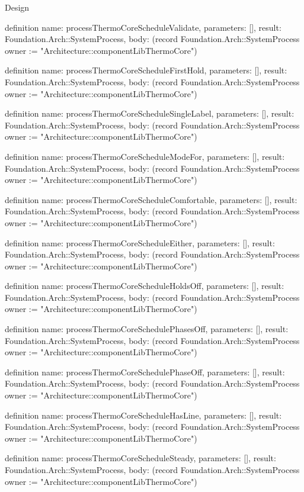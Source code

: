 \begin{lexlean}{Design}
\begin{semanticmodule}
definition{
  name: processThermoCoreScheduleValidate,
  parameters: [],
  result: Foundation.Arch::SystemProcess,
  body: (record Foundation.Arch::SystemProcess {owner := "Architecture::componentLibThermoCore"})
}

definition{
  name: processThermoCoreScheduleFirstHold,
  parameters: [],
  result: Foundation.Arch::SystemProcess,
  body: (record Foundation.Arch::SystemProcess {owner := "Architecture::componentLibThermoCore"})
}

definition{
  name: processThermoCoreScheduleSingleLabel,
  parameters: [],
  result: Foundation.Arch::SystemProcess,
  body: (record Foundation.Arch::SystemProcess {owner := "Architecture::componentLibThermoCore"})
}

definition{
  name: processThermoCoreScheduleModeFor,
  parameters: [],
  result: Foundation.Arch::SystemProcess,
  body: (record Foundation.Arch::SystemProcess {owner := "Architecture::componentLibThermoCore"})
}

definition{
  name: processThermoCoreScheduleComfortable,
  parameters: [],
  result: Foundation.Arch::SystemProcess,
  body: (record Foundation.Arch::SystemProcess {owner := "Architecture::componentLibThermoCore"})
}

definition{
  name: processThermoCoreScheduleEither,
  parameters: [],
  result: Foundation.Arch::SystemProcess,
  body: (record Foundation.Arch::SystemProcess {owner := "Architecture::componentLibThermoCore"})
}

definition{
  name: processThermoCoreScheduleHoldsOff,
  parameters: [],
  result: Foundation.Arch::SystemProcess,
  body: (record Foundation.Arch::SystemProcess {owner := "Architecture::componentLibThermoCore"})
}

definition{
  name: processThermoCoreSchedulePhasesOff,
  parameters: [],
  result: Foundation.Arch::SystemProcess,
  body: (record Foundation.Arch::SystemProcess {owner := "Architecture::componentLibThermoCore"})
}

definition{
  name: processThermoCoreSchedulePhaseOff,
  parameters: [],
  result: Foundation.Arch::SystemProcess,
  body: (record Foundation.Arch::SystemProcess {owner := "Architecture::componentLibThermoCore"})
}

definition{
  name: processThermoCoreScheduleHasLine,
  parameters: [],
  result: Foundation.Arch::SystemProcess,
  body: (record Foundation.Arch::SystemProcess {owner := "Architecture::componentLibThermoCore"})
}

definition{
  name: processThermoCoreScheduleSteady,
  parameters: [],
  result: Foundation.Arch::SystemProcess,
  body: (record Foundation.Arch::SystemProcess {owner := "Architecture::componentLibThermoCore"})
}


\end{semanticmodule}
\end{lexlean}
